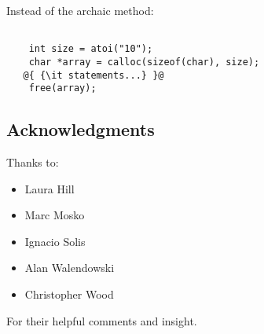 \documentclass[fleqn,12pt]{PARCOneColumn} %
\begin{document}
Instead of the archaic method:

\begin{lstlisting}[backgroundcolor=\color{badCodeColor}]

    int size = atoi("10");
    char *array = calloc(sizeof(char), size);
   @{ {\it statements...} }@
    free(array);
\end{lstlisting}
\subsection*{Acknowledgments} %

Thanks to: \hfil\break
\begin{itemize}
\item Laura Hill
\item Marc Mosko
\item Ignacio Solis
\item Alan Walendowski
\item Christopher Wood
\end{itemize}

For their helpful comments and insight.


\end{document}

